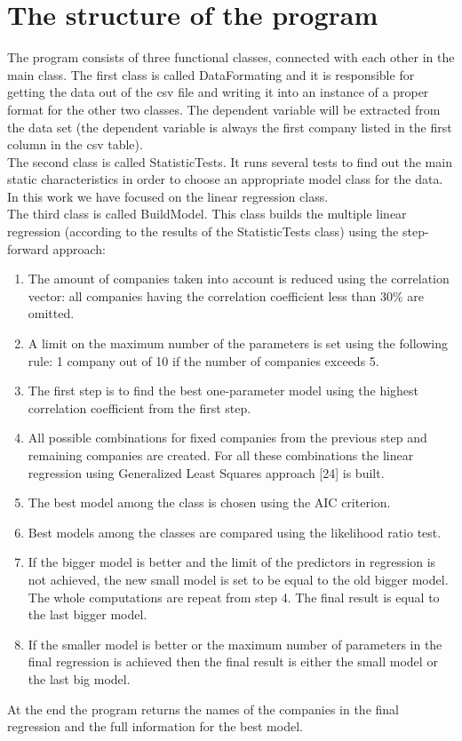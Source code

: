 \documentclass[
  twoside,
  11pt, a4paper,
  footinclude=true,
  headinclude=true,
  cleardoublepage=empty
]{scrreprt}
\begin{document}
    \section{The structure of the program}
    The program consists of three functional classes, connected with each other in the main class. The first class is called DataFormating and it is responsible for getting the data out of the csv file and writing it into an instance of a proper format for the other two classes. The dependent variable will be extracted from the data set (the dependent variable is always the first company listed in the first column in the csv table).\\
    The second class is called StatisticTests. It runs several tests to find out the main static characteristics in order to choose an appropriate model class for the data. In this work we have focused on the linear regression class.\\
    The third class is called BuildModel. This class builds the multiple linear regression (according to the results of the StatisticTests class) using the step-forward approach:
    \begin{enumerate}
        \item The amount of companies taken into account is reduced using the correlation vector: all companies having the correlation coefficient less than 30\% are omitted.
        \item A limit on the maximum number of the parameters is set using the following rule: 1 company out of 10 if the number of companies exceeds 5.
        \item The first step is to find the best one-parameter model using the highest correlation coefficient from the first step.
        \item All possible combinations for fixed companies from the previous step and remaining companies are created. For all these combinations the linear regression using Generalized Least Squares approach [24] is built.
        \item The best model among the class is chosen using the AIC criterion.
        \item Best models among the classes are compared using the likelihood ratio test. 
        \item If the bigger model is better and the limit of the predictors in regression is not achieved, the new small model is set to be equal to the old bigger model. The whole computations are repeat from step 4. The final result is equal to the last bigger model.
        \item If the smaller model is better or the maximum number of parameters in the final regression is achieved then the final result is either the small model or the last big model. 
    \end{enumerate} 
    At the end the program returns the names of the companies in the final regression and the full information for the best model.
    
\end{document}
